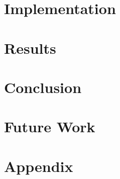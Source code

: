\documentclass[12pt]{article}
\begin{document}
\section{Implementation}

\section{Results}

\section{Conclusion}

\section{Future Work}

\section{Appendix}

\renewcommand{\refname}{Reference} %
\printbibliography
\end{document}
